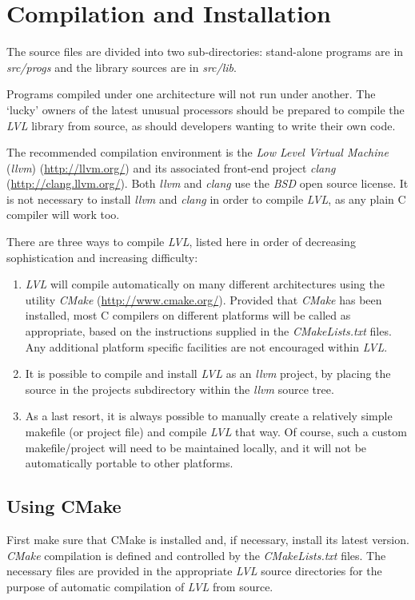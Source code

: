 \documentclass[11pt,twoside,english,a4paper]{article}
\begin{document}
\section{Compilation and Installation}
The source files are divided into two sub-directories: stand-alone programs are in \textit{src/progs} and the library sources are in  \textit{src/lib}.

Programs compiled under one architecture will not run under
another. The `lucky' owners of the latest unusual processors should
be prepared to compile the \emph{LVL} library from source, as should developers
wanting to write their own code.

The recommended compilation environment is the \emph{Low Level Virtual Machine} (\emph{llvm}) (\url{http://llvm.org/}) and its associated front-end project \emph{clang} (\url{http://clang.llvm.org/}). Both \emph{llvm} and \emph{clang} use the \emph{BSD} open source license. It is not necessary to install \emph{llvm} and \emph{clang} in order to compile \emph{LVL}, as any plain C compiler will work too.

There are three ways to compile \emph{LVL}, listed here in order of decreasing sophistication and increasing difficulty:
\begin{enumerate}
\item \emph{LVL} will compile automatically on many different architectures using the utility  \emph{CMake} (\url{http://www.cmake.org/}). Provided that \emph{CMake} has been installed, most C compilers on different platforms will be called as
appropriate, based on the instructions supplied in the \emph{CMakeLists.txt} files. 
Any additional platform specific facilities are not encouraged within \emph{LVL}. 
\item It is possible to compile and install \emph{LVL} as an \emph{llvm} project, by placing the source in the projects subdirectory within the \emph{llvm} source tree.
\item As a last resort, it is always possible to manually create a relatively simple makefile (or project file) and compile \emph{LVL} that way. Of course, such a custom makefile/project will need to be maintained locally, and it will not be automatically portable to other platforms.
\end{enumerate}

\subsection{Using CMake}
First make sure that CMake is installed and, if necessary, install its latest version. \emph{CMake} compilation is defined and controlled by the \emph{CMakeLists.txt} files. The necessary files are provided in the appropriate \emph{LVL} source directories for the purpose of automatic compilation of \emph{LVL} from source. 
\end{document}
